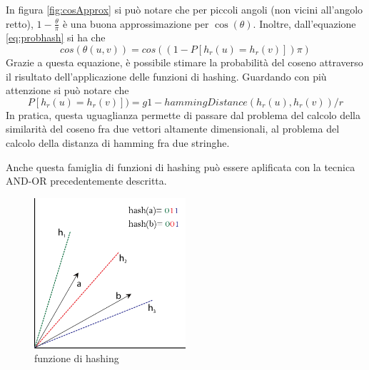 \documentclass[a4paper,12pt]{report}
\begin{document}
In figura \ref{fig:cosApprox} si può notare che per piccoli angoli (non vicini all'angolo retto),  $ 1 - \frac{\theta}{\pi}$ è una buona approssimazione per  $\cos(\theta)$. Inoltre, dall'equazione \ref{eq:probhash} si ha che 
\begin{equation}
cos(\theta(u,v))=cos((1-P[h_r(u)=h_r(v)])\pi)
\end{equation}
Grazie a questa equazione, è possibile stimare la probabilità del coseno attraverso il risultato dell'applicazione delle funzioni di hashing. Guardando con più attenzione si può notare che
\begin{equation*}
 P[h_r(u)=h_r(v)])=g1-hammingDistance(h_r(u),h_r(v))/r
\end{equation*}
In pratica, questa uguaglianza permette di passare dal problema del calcolo della similarità del coseno fra due vettori altamente dimensionali, al problema del calcolo della distanza di hamming fra due stringhe.

 Anche questa famiglia di funzioni di hashing può essere aplificata con la tecnica AND-OR precedentemente descritta.
\begin{figure}
    \centering
\includegraphics[width=0.5\textwidth]{hashing}
\caption{funzione di hashing}
\label{fig:hashingFunction}
\end{figure} 

\end{document}

